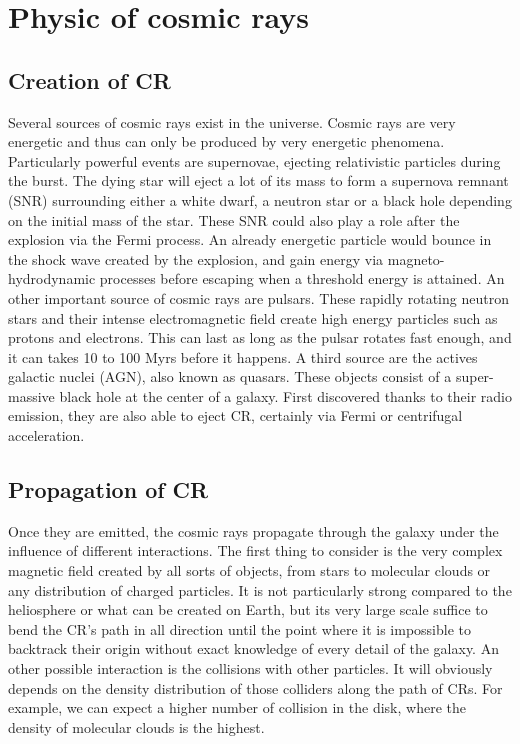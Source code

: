 \section{Physic of cosmic rays}

\subsection{Creation of CR}
\label{sec:creation_of_CRs}

Several sources of cosmic rays exist in the universe. Cosmic rays are very energetic and thus can only be produced by very energetic phenomena. Particularly powerful events are supernovae, ejecting relativistic particles during the burst. The dying star will eject a lot of its mass to form a supernova remnant (SNR) surrounding either a white dwarf, a neutron star or a black hole depending on the initial mass of the star. These SNR could also play a role after the explosion via the Fermi process. An already energetic particle would bounce in the shock wave created by the explosion, and gain energy via magneto-hydrodynamic processes before escaping when a threshold energy is attained.
An other important source of cosmic rays are pulsars. These rapidly rotating neutron stars and their intense electromagnetic field create high energy particles such as protons and electrons. This can last as long as the pulsar rotates fast enough, and it can takes 10 to 100 Myrs before it happens.
A third source are the actives galactic nuclei (AGN), also known as quasars. These objects consist of a super-massive black hole at the center of a galaxy. First discovered thanks to their radio emission, they are also able to eject CR, certainly via Fermi or centrifugal acceleration.


\subsection{Propagation of CR}

Once they are emitted, the cosmic rays propagate through the galaxy under the influence of different interactions.
The first thing to consider is the very complex magnetic field created by all sorts of objects, from stars to molecular clouds or any distribution of charged particles. It is not particularly strong  compared to the heliosphere or what can be created on Earth, but its very large scale suffice to bend the CR's path in all direction until the point where it is impossible to backtrack their origin without exact knowledge of every detail of the galaxy.
An other possible interaction is the collisions with other particles. It will obviously depends on the density distribution of those colliders along the path of CRs. For example, we can expect a higher number of collision in the disk, where the density of molecular clouds is the highest.

